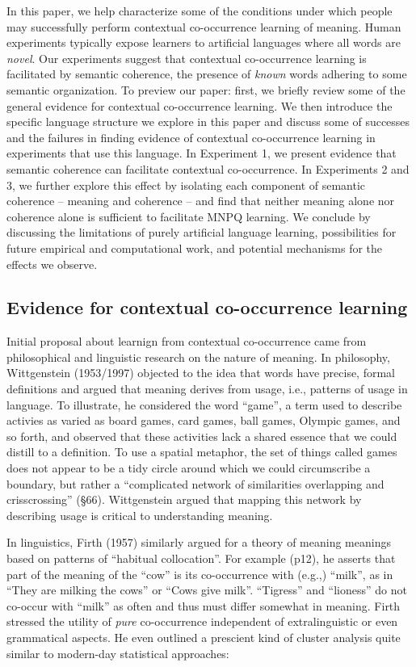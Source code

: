 \documentclass[man,floatsintext]{apa6}
\begin{document}
In this paper, we help characterize some of the conditions under which people may successfully perform contextual co-occurrence learning of meaning. Human experiments typically expose learners to artificial languages where all words are \emph{novel}. Our experiments suggest that contextual co-occurrence learning is facilitated by semantic coherence, the presence of \emph{known} words adhering to some semantic organization. To preview our paper: first, we briefly review some of the general evidence for contextual co-occurrence learning. We then introduce the specific language structure we explore in this paper and discuss some of successes and the failures in finding evidence of contextual co-occurrence learning in experiments that use this language. In Experiment 1, we present evidence that semantic coherence can facilitate contextual co-occurrence. In Experiments 2 and 3, we further explore this effect by isolating each component of semantic coherence -- meaning and coherence -- and find that neither meaning alone nor coherence alone is sufficient to facilitate MNPQ learning. We conclude by discussing the limitations of purely artificial language learning, possibilities for future empirical and computational work, and potential mechanisms for the effects we observe.
 
\subsection{Evidence for contextual co-occurrence learning}

Initial proposal about learnign from contextual co-occurrence came from philosophical and linguistic research on the nature of meaning. In philosophy, Wittgenstein (1953/1997) objected to the idea that words have precise, formal definitions and argued that meaning derives from usage, i.e., patterns of usage in language. To illustrate, he considered the word ``game'', a term used to describe activies as varied as board games, card games, ball games, Olympic games, and so forth, and observed that these activities lack a shared essence that we could distill to a definition. To use a spatial metaphor, the set of things called games does not appear to be a tidy circle around which we could circumscribe a boundary, but rather a ``complicated network of similarities overlapping and crisscrossing'' (\S 66). Wittgenstein argued that mapping this network by describing usage is critical to understanding meaning.

In linguistics, Firth (1957) similarly argued for a theory of meaning meanings based on patterns of ``habitual collocation''. For example (p12), he asserts that part of the meaning of the ``cow'' is its co-occurrence with (e.g.,) ``milk'', as in ``They are milking the cows'' or ``Cows give milk''. ``Tigress'' and ``lioness'' do not co-occur with ``milk'' as often and thus must differ somewhat in meaning. Firth stressed the utility of \emph{pure} co-occurrence independent of extralinguistic or even grammatical aspects. He even outlined a prescient kind of cluster analysis quite similar to modern-day statistical approaches:
\end{document}
